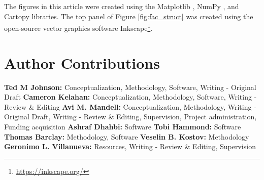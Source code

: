 \documentclass[linenumbers,5p,twocolumn,authoryear]{elsarticle}
\begin{document}
The figures in this article were created using the Matplotlib \citep{hunter2007}, NumPy \citep{harris2020}, and Cartopy \citep{metoffice2010} libraries. The top panel of Figure \ref{fig:fac_struct} was created using the open-source vector graphics software Inkscape\footnote{\url{https://inkscape.org/}}.

\section{Author Contributions} %
{\bf Ted M Johnson:} Conceptualization, Methodology, Software, Writing - Original Draft
{\bf Cameron Kelahan:} Conceptualization, Methodology, Software, Writing - Review \& Editing
{\bf Avi M. Mandell:} Conceptualization, Methodology, Writing - Original Draft, Writing - Review \& Editing, Supervision, Project administration, Funding acquisition
{\bf Ashraf Dhahbi:} Software
{\bf Tobi Hammond:} Software
{\bf Thomas Barclay:} Methodology, Software
{\bf Veselin B. Kostov:} Methodology
{\bf Geronimo L. Villanueva:} Resources, Writing - Review \& Editing, Supervision




\end{document}
